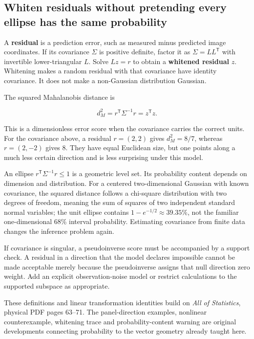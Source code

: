 \subsection{Whiten residuals without pretending every ellipse has the same probability}\label{02-foundations-ii-ch023-whiten-residuals-without-pretending-every-ellipse-has-the-same-probability}

\hypertarget{02-foundations-ii-ch023-whiten-residuals-without-pretending-every-ellipse-has-the-same-probability}{}

A \textbf{residual} is a prediction error, such as measured minus predicted image coordinates. If its covariance \(\Sigma\) is positive definite, factor it as \(\Sigma=LL^{\mathsf T}\) with invertible lower-triangular \(L\). Solve \(Lz=r\) to obtain a \textbf{whitened residual} \(z\). Whitening makes a random residual with that covariance have identity covariance. It does not make a non-Gaussian distribution Gaussian.

The squared Mahalanobis distance is

\[
d_M^2=r^{\mathsf T}\Sigma^{-1}r=z^{\mathsf T}z.
\]

This is a dimensionless error score when the covariance carries the correct units. For the covariance above, a residual \(r=(2,2)\) gives \(d_M^2=8/7\), whereas \(r=(2,-2)\) gives \(8\). They have equal Euclidean size, but one points along a much less certain direction and is less surprising under this model.

An ellipse \(r^{\mathsf T}\Sigma^{-1}r\le1\) is a geometric level set. Its probability content depends on dimension and distribution. For a centered two-dimensional Gaussian with known covariance, the squared distance follows a chi-square distribution with two degrees of freedom, meaning the sum of squares of two independent standard normal variables; the unit ellipse contains \(1-e^{-1/2}\approx39.35\%\), not the familiar one-dimensional 68\% interval probability. Estimating covariance from finite data changes the inference problem again.

If covariance is singular, a pseudoinverse score must be accompanied by a support check. A residual in a direction that the model declares impossible cannot be made acceptable merely because the pseudoinverse assigns that null direction zero weight. Add an explicit observation-noise model or restrict calculations to the supported subspace as appropriate.

These definitions and linear transformation identities build on \emph{All of Statistics}, physical PDF pages 63--71. The panel-direction examples, nonlinear counterexample, whitening trace and probability-content warning are original developments connecting probability to the vector geometry already taught here.

